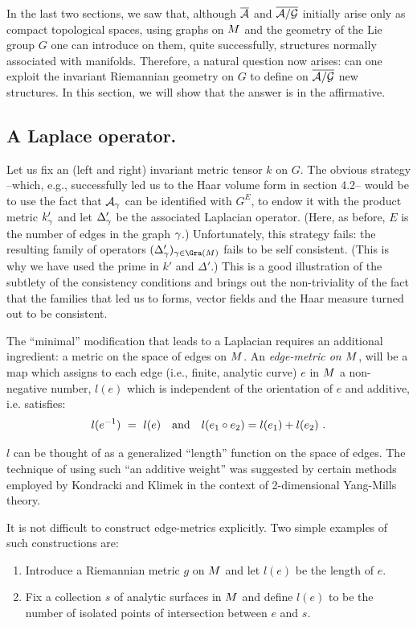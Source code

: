 In the last two sections, we saw that, although $\Ab$ and $\agb$
initially arise only as compact topological spaces, using graphs on
$\S$ and the geometry of the Lie group $G$ one can introduce on them,
quite successfully, structures normally associated with manifolds.
Therefore, a natural question now arises: can one exploit the
invariant Riemannian geometry on $G$ to define on $\agb$ new
structures. In this section, we will show that the answer is in the 
affirmative.

\subsection{A Laplace operator.}

Let us fix an (left and right) invariant metric tensor $k$ on $G$.
The obvious strategy --which, e.g., successfully led us to the Haar
volume form in section 4.2-- would be to use the fact that $\A_\g$ can
be identified with $G^E$, to endow it with the product metric
${k}'_\g$ and let ${\Delta}'_\g$ be the associated Laplacian operator.
(Here, as before, $E$ is the number of edges in the graph $\g$.)
Unfortunately, this strategy fails: the resulting family of operators
$({\Delta}'_\g)_{\g\in\Gra(\S)}$ fails to be self consistent. (This is
why we have used the prime in $k'$ and ${\Delta}'$.) This is a
good illustration of the subtlety of the consistency conditions and
brings out the non-triviality of the fact that the families that led
us to forms, vector fields and the Haar measure turned out to be
consistent.
 
The ``minimal'' modification that leads to a Laplacian requires an
additional ingredient: a metric on the space of edges on $\S$. An {\it
edge-metric on $\S$}, will be a map which assigns to each edge (i.e.,
finite, analytic curve) $e$ in $\S$ a non-negative number, $l(e)$
which is independent of the orientation of $e$ and additive, i.e.
satisfies:
\begin{equation}
l(e^{-1})\ =\ l(e)\ \ \ {\rm and}\ \ \ l(e_1\circ e_2)= l(e_1)
+l(e_2)\ .
\end{equation}

\medskip\noindent
$l$ can be thought of as a generalized ``length'' function on the
space of edges.  The technique of using such  ``an additive weight''
was suggested by certain methods employed by Kondracki and Klimek
\cite{KK} in the context of 2-dimensional Yang-Mills theory.

It is not difficult to construct edge-metrics explicitly.  Two simple
examples of such constructions are:
\begin{enumerate}
\item Introduce a Riemannian metric $g$ on $\S$ and let  
$l(e)$ be the length of $e$.  
\item Fix a collection $s$ of analytic surfaces in $\S$ and define $l(e)$
to be the number of isolated points of intersection between $e$ and
$s$.
\end{enumerate}
\bigskip


